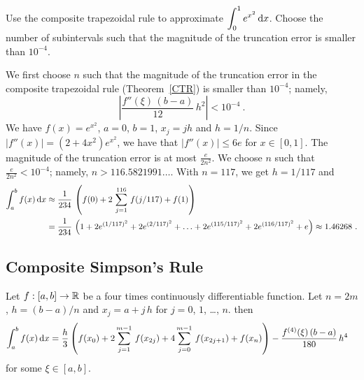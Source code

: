 \begin{egg}
Use the composite trapezoidal rule to approximate
$\displaystyle \int_0^1 e^{x^2}\,\mathrm{d}x$.
Choose the number of subintervals such that the magnitude of the
truncation error is smaller than $10^{-4}$.

We first choose $n$ such that the magnitude of the truncation error in
the composite trapezoidal rule (Theorem~\ref{CTR}) is smaller than
$10^{-4}$; namely,
\[
\left| \frac{f''(\xi)\,(b-a)}{12}\,h^2 \right| < 10^{-4} \ .
\]
We have $\displaystyle f(x)=e^{x^2}$, $a=0$, $b=1$, $x_j = jh$ and
$h = 1/n$.  Since $\displaystyle |f''(x)|=(2+4x^2)e^{x^2}$,
we have that $|f''(x)|\leq 6e$ for $x \in [0,1]$.  The magnitude of
the truncation error is at most $\displaystyle \frac{e}{2n^2}$.  We
choose $n$ such that $\displaystyle \frac{e}{2n^2} <10^{-4}$; namely, 
$n> 116.5821991\ldots$.  With $n=117$, we get $h=1/117$ and
\begin{align*}
\int_{a}^{b}f(x)\,\mathrm{d}x &\approx
\frac{1}{234}\, \left(f(0)+2\,\sum_{j=1}^{116}\,f(j/117)+f(1)\right) \\
&= \frac{1}{234}\, \left( 1 + 2e^{(1/117)^2}
+2e^{(2/117)^2}+ \ldots + 2e^{(115/117)^2}+2e^{(116/117)^2}
+ e \right) \approx 1.46268 \ .
\end{align*}
\label{T1}
\end{egg}

\subsection{Composite Simpson's Rule}

\begin{theorem}
Let $f:[a,b]\rightarrow \mathbb{R}$ be a four times continuously
differentiable function.  Let $n=2m$, $h=(b-a)/n$ and
$x_j = a+j\,h$ for $j=0$, $1$, \ldots, $n$.  then
\begin{align*}
\int_{a}^{b}f(x)\,\mathrm{d}x &=
\frac{h}{3} \left(f(x_0) + 2\sum_{j=1}^{m-1}\,f(x_{2j}) + 4
\sum_{j=0}^{m-1}\,f(x_{2j+1}) + f(x_n) \right) -
\frac{f^{(4)}(\xi)\,(b-a)}{180}\, h^4
\end{align*}
for some $\xi \in [a,b]$.
\label{CSR}
\end{theorem}

